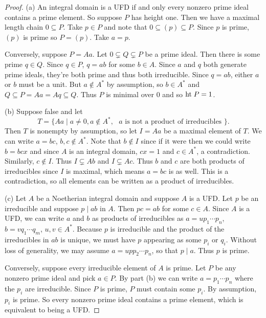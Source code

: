 \documentclass{article}
\newcommand{\Ht}{\textup{ht}\;}
\begin{document}
\begin{proof}
(a) An integral domain is a UFD if and only every nonzero prime ideal contains a prime element. So suppose $P$ has height one. Then we have a maximal length chain $0 \subseteq P$. Take $p \in P$ and note that $0 \subseteq (p) \subseteq P$. Since $p$ is prime, $(p)$ is prime so $P = (p)$. Take $a = p$.

Conversely, suppose $P = Aa$. Let $0 \subsetneq Q \subsetneq P$ be a prime ideal. Then there is some prime $q \in Q$. Since $q \in P$, $q = ab$ for some $b \in A$. Since $a$ and $q$ both generate prime ideals, they're both prime and thus both irreducible. Since $q = ab$, either $a$ or $b$ must be a unit. But $a \notin A^*$ by assumption, so $b \in A^*$ and $Q \subseteq P = Aa = Aq \subseteq Q$. Thus $P$ is minimal over $0$ and so $\Ht P = 1$.

(b) Suppose false and let
\[
T = \{Aa \mid a \neq 0, a \notin A^*, \text{ $a$ is not a product of irreducibles }\}.
\]
Then $T$ is nonempty by assumption, so let $I = Aa$ be a maximal element of $T$. We can write $a = bc$, $b,c \notin A^*$. Note that $b \notin I$ since if it were then we could write $b = bcx$ and since $A$ is an integral domain, $cx = 1$ and $c \in A^*$, a contradiction. Similarly, $c \notin I$. Thus $I \subsetneq Ab$ and $I \subsetneq Ac$. Thus $b$ and $c$ are both products of irreducibles since $I$ is maximal, which means $a = bc$ is as well. This is a contradiction, so all elements can be written as a product of irreducibles.

(c) Let $A$ be a Noetherian integral domain and suppose $A$ is a UFD. Let $p$ be an irreducible and suppose $p \mid ab$ in $A$. Then $pc = ab$ for some $c \in A$. Since $A$ is a UFD, we can write $a$ and $b$ as products of irreducibles as $a = up_1 \cdots p_n$, $b = vq_1 \cdots q_m$, $u,v \in A^*$. Because $p$ is irreducible and the product of the irreducibles in $ab$ is unique, we must have $p$ appearing as some $p_i$ or $q_i$. Without loss of generality, we may assume $a = upp_2 \cdots p_n$, so that $p \mid a$. Thus $p$ is prime.

Conversely, suppose every irreducible element of $A$ is prime. Let $P$ be any nonzero prime ideal and pick $a \in P$. By part (b) we can write $a = p_1 \cdots p_n$ where the $p_i$ are irreducible. Since $P$ is prime, $P$ must contain some $p_i$. By assumption, $p_i$ is prime. So every nonzero prime ideal contains a prime element, which is equivalent to being a UFD.
\end{proof}
\end{document}
